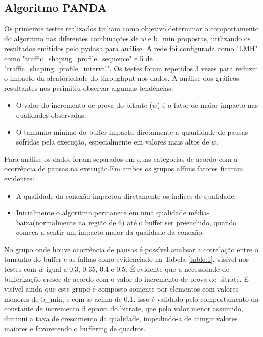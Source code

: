 \documentclass[10pt,twocolumn,letterpaper]{article}
\begin{document}
	\subsection{Algoritmo PANDA}
	Os primeiros testes realizados tinham como objetivo determinar o comportamento do algoritmo nas diferentes combinações de $w$ e b\_min propostas, utilizando os resultados emitidos pelo pydash para análise. A rede foi configurada como "LMH" como "traffic\_shaping\_profile\_sequence" e 5 de "traffic\_shaping\_profile\_interval". Os testes foram repetidos 3 vezes para reduzir o impacto da aleatóriedade do throughput nos dados. A análise dos gráficos resultantes nos perimitiu observar algumas tendências: 
	\begin{itemize}
		\item O valor do incremento de prova do bitrate ($w$) é o fator de maior impacto nas qualidades observadas. 
		\item O tamanho mínimo do buffer impacta diretamente a quantidade de pausas sofridas pela execução, especialmente em valores mais altos de $w$.
	\end{itemize}
	Para análise os dados foram separados em duas categorias de acordo com a ocorrência de pausas na execução.Em ambos os grupos alfuns fatores ficaram evidentes:
	\begin{itemize}
		\item A qualidade da conexão impactou diretamente os índices de qualidade.
		\item Inicialmente o algoritmo permanece em uma qualidade média-baixa(normalmente na região de 6) até o buffer ser preenchido, quando começa a sentir um impacto maior da qualidade da conexão.
	\end{itemize}
	
	No grupo onde houve ocorrência de pausas é possível analisar a correlação entre o tamanho do buffer e as falhas como evidenciado na Tabela \ref{table:1}, visível nos testes com $w$ igual a 0.3, 0.35, 0.4 e  0.5. É evidente que a necessidade de bufferização cresce de acordo com o valor do incremento de prova de bitrate. É visível ainda que este grupo é composto somente por elementos com valores menores de b\_min, e com $w$ acima de 0.1. Isso é validado pelo comportamento da  
	constante de incremento d eprova do bitrate, que pelo valor menor assumido, diminui a taxa de crescimento da qualidade, impedindo-a de atingir valores maiores e favorecendo o buffering de quadros.
	
\end{document}
